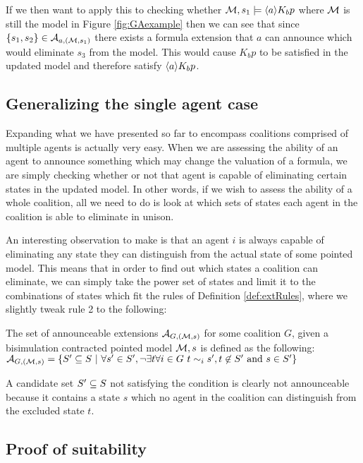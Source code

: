 If we then want to apply this to checking whether $\mathcal{M},s_1 \models \langle a\rangle K_bp$ where $\mathcal{M}$ is still the model in Figure \ref{fig:GAexample} then we can see that since $\{s_1,s_2\}\in\mathcal{A}_{a,(\mathcal{M},s_1)}$ there exists a formula extension that $a$ can announce which would eliminate $s_3$ from the model. This would cause $K_bp$ to be satisfied in the updated model and therefore satisfy $\langle a\rangle K_bp$.

\subsection{Generalizing the single agent case}

Expanding what we have presented so far to encompass coalitions comprised of multiple agents is actually very easy. 
When we are assessing the ability of an agent to announce something which may change the valuation of a formula, we are simply checking whether or not that agent is capable of eliminating certain states in the updated model. In other words, if we wish to assess the ability of a whole coalition, all we need to do is look at which sets of states each agent in the coalition is able to eliminate in unison.

An interesting observation to make is that an agent $i$ is always capable of eliminating any state they can distinguish from the actual state of some pointed model. This means that in order to find out which states a coalition can eliminate, we can simply take the power set of states and limit it to the combinations of states which fit the rules of Definition \ref{def:extRules}, where we slightly tweak rule 2 to the following:

\begin{definition}
	\label{def:extscoal}
	The set of announceable extensions $\mathcal{A}_{G,(\mathcal{M},s)}$ for some coalition $G$, given a bisimulation contracted pointed model $\mathcal{M},s$ is defined as the following: \\
	$\mathcal{A}_{G,(\mathcal{M},s)} = \{S' \subseteq S ~|~ \forall s'\in S', \neg\exists t\forall i\in G ~ t\sim_i s', t\not\in S' \textrm{ and } s\in S'\}$
\end{definition}

A candidate set $S'\subseteq S$ not satisfying the condition is clearly not announceable because it contains a state $s$ which no agent in the coalition can distinguish from the excluded state $t$.

\subsection{Proof of suitability}

